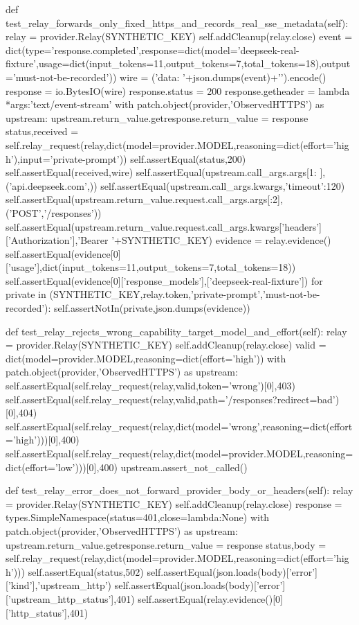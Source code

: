     def test_relay_forwards_only_fixed_https_and_records_real_sse_metadata(self):
        relay = provider.Relay(SYNTHETIC_KEY)
        self.addCleanup(relay.close)
        event = dict(type='response.completed',response=dict(model='deepseek-real-fixture',usage=dict(input_tokens=11,output_tokens=7,total_tokens=18),output='must-not-be-recorded'))
        wire = ('data: '+json.dumps(event)+'\n\n').encode()
        response = io.BytesIO(wire)
        response.status = 200
        response.getheader = lambda *args:'text/event-stream'
        with patch.object(provider,'ObservedHTTPS') as upstream:
            upstream.return_value.getresponse.return_value = response
            status,received = self.relay_request(relay,dict(model=provider.MODEL,reasoning=dict(effort='high'),input='private-prompt'))
            self.assertEqual(status,200)
            self.assertEqual(received,wire)
            self.assertEqual(upstream.call_args.args[1: ],('api.deepseek.com',))
            self.assertEqual(upstream.call_args.kwargs,{'timeout':120})
            self.assertEqual(upstream.return_value.request.call_args.args[:2],('POST','/responses'))
            self.assertEqual(upstream.return_value.request.call_args.kwargs['headers']['Authorization'],'Bearer '+SYNTHETIC_KEY)
        evidence = relay.evidence()
        self.assertEqual(evidence[0]['usage'],dict(input_tokens=11,output_tokens=7,total_tokens=18))
        self.assertEqual(evidence[0]['response_models'],['deepseek-real-fixture'])
        for private in (SYNTHETIC_KEY,relay.token,'private-prompt','must-not-be-recorded'):
            self.assertNotIn(private,json.dumps(evidence))

    def test_relay_rejects_wrong_capability_target_model_and_effort(self):
        relay = provider.Relay(SYNTHETIC_KEY)
        self.addCleanup(relay.close)
        valid = dict(model=provider.MODEL,reasoning=dict(effort='high'))
        with patch.object(provider,'ObservedHTTPS') as upstream:
            self.assertEqual(self.relay_request(relay,valid,token='wrong')[0],403)
            self.assertEqual(self.relay_request(relay,valid,path='/responses?redirect=bad')[0],404)
            self.assertEqual(self.relay_request(relay,dict(model='wrong',reasoning=dict(effort='high')))[0],400)
            self.assertEqual(self.relay_request(relay,dict(model=provider.MODEL,reasoning=dict(effort='low')))[0],400)
            upstream.assert_not_called()

    def test_relay_error_does_not_forward_provider_body_or_headers(self):
        relay = provider.Relay(SYNTHETIC_KEY)
        self.addCleanup(relay.close)
        response = types.SimpleNamespace(status=401,close=lambda:None)
        with patch.object(provider,'ObservedHTTPS') as upstream:
            upstream.return_value.getresponse.return_value = response
            status,body = self.relay_request(relay,dict(model=provider.MODEL,reasoning=dict(effort='high')))
        self.assertEqual(status,502)
        self.assertEqual(json.loads(body)['error']['kind'],'upstream_http')
        self.assertEqual(json.loads(body)['error']['upstream_http_status'],401)
        self.assertEqual(relay.evidence()[0]['http_status'],401)

